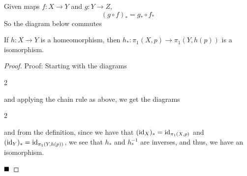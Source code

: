 \begin{lemma}
    Given maps $f : X \to Y$ and $g : Y \to Z$, 
    \[ (g \circ f)_{*} = g_{*} \circ f_{*} \]
    So the diagram below commutes
    \begin{center}
    \end{center}
\end{lemma}

\begin{lemma}
    If $h : X \to Y$ is a homeomorphism, then $h_{*} : \pi_1(X, p) \to \pi_1(Y, h(p))$ is a isomorphism.
\end{lemma}
\begin{proof}{Proof:}
    Starting with the diagrams
    \begin{multicols}{2}
        \begin{center}
        \end{center}
        \columnbreak

        \begin{center}
        \end{center}
    \end{multicols}
    and applying the chain rule as above, we get the diagrams
    \begin{multicols}{2}
        \begin{center}
        \end{center}
        \columnbreak

        \begin{center}
        \end{center}
    \end{multicols}
    and from the definition, since we have that $(\text{id}_{X})_{*} = \text{id}_{\pi_1(X, p)}$ and $(\text{id}_{Y})_{*} = \text{id}_{\pi_1(Y, h(p))}$, we see that $h_{*}$ and $h_{*}^{-1}$ are inverses, and thus, we have an isomorphism. 

    $\qed$
\end{proof}


